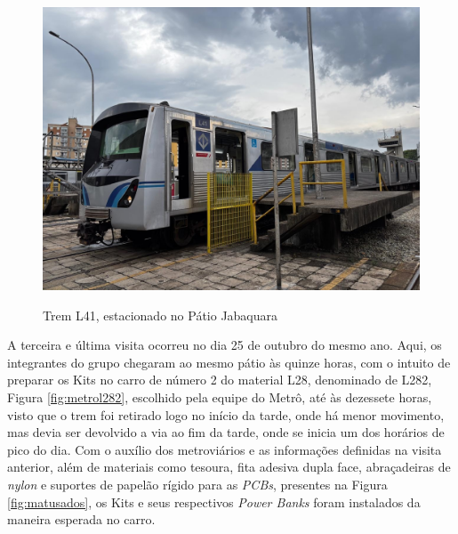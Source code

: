 \documentclass[acronym,symbols,table]{fei}
\begin{document}
\begin{figure}[!htb]
\centering
    \caption{Trem L41, estacionado no Pátio Jabaquara}
    \includegraphics[width=0.60\linewidth]{Imagens/metrol41.jpg}
    \label{fig:metrol41}
\end{figure}
\newpage
A terceira e última visita ocorreu no dia 25 de outubro do mesmo ano. Aqui, os integrantes do grupo chegaram ao mesmo pátio às quinze horas, com o intuito de preparar os Kits no carro de número 2 do material L28, denominado de L282, Figura \ref{fig:metrol282}, escolhido pela equipe do Metrô, até às dezessete horas, visto que o trem foi retirado logo no início da tarde, onde há menor movimento, mas devia ser devolvido a via ao fim da tarde, onde se inicia um dos horários de pico do dia. Com o auxílio dos metroviários e as informações definidas na visita anterior, além de materiais como tesoura, fita adesiva dupla face, abraçadeiras de \textit{nylon} e suportes de papelão rígido para as \textit{PCBs}, presentes na Figura \ref{fig:matusados}, os Kits e seus respectivos \textit{Power Banks} foram instalados da maneira esperada no carro. 
\end{document}
